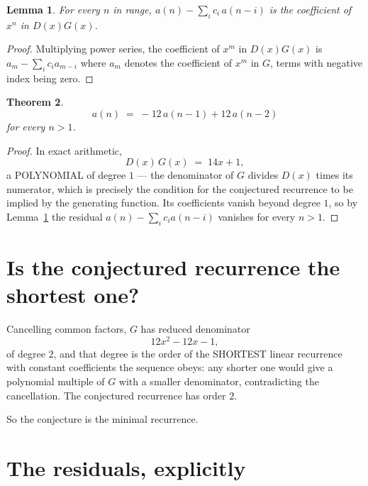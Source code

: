 \documentclass[11pt,a4paper]{article}
\theoremstyle{plain}
\newtheorem{theorem}{Theorem}
\newtheorem{lemma}[theorem]{Lemma}
\theoremstyle{definition}
\begin{document}
\begin{lemma}\label{lem:key}
For every $n$ in range, $a(n)-\sum_i c_i\,a(n-i)$ is the coefficient of $x^{n}$ in
$D(x)G(x)$.
\end{lemma}

\begin{proof}
Multiplying power series, the coefficient of $x^{m}$ in $D(x)G(x)$ is
$a_m-\sum_i c_i a_{m-i}$ where $a_m$ denotes the coefficient of $x^{m}$ in $G$, terms with
negative index being zero.
\end{proof}

\begin{theorem}
\[
a(n)\;=\;-12\,a(n-1) + 12\,a(n-2)
\]
for every $n>1$.
\end{theorem}

\begin{proof}
In exact arithmetic,
\[
D(x)\,G(x)\;=\;14 x + 1,
\]
a POLYNOMIAL of degree $1$ --- the denominator of $G$ divides $D(x)$ times its numerator,
which is precisely the condition for the conjectured recurrence to be implied by the
generating function. Its coefficients vanish beyond degree $1$, so by
Lemma~\ref{lem:key} the residual $a(n)-\sum_ic_ia(n-i)$ vanishes for every
$n>1$.
\end{proof}

\section{Is the conjectured recurrence the shortest one?}

Cancelling common factors, $G$ has reduced denominator
\[
12 x^{2} - 12 x - 1,
\]
of degree $2$, and that degree is the order of the SHORTEST linear recurrence with
constant coefficients the sequence obeys: any shorter one would give a polynomial multiple of
$G$ with a smaller denominator, contradicting the cancellation. The conjectured recurrence has
order $2$.

So the conjecture is the minimal recurrence.

\section{The residuals, explicitly}
\end{document}
